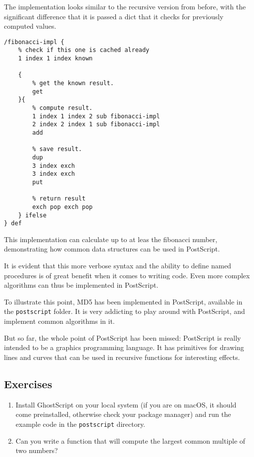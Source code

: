 \documentclass[a4paper,twocolumn]{article}
\begin{document}
The implementation looks similar to the recursive version from before, with the significant difference that it is passed a dict that it checks for previously computed values.

\begin{verbatim}
/fibonacci-impl {
    % check if this one is cached already
    1 index 1 index known

    {
        % get the known result.
        get
    }{
        % compute result.
        1 index 1 index 2 sub fibonacci-impl
        2 index 2 index 1 sub fibonacci-impl
        add

        % save result.
        dup
        3 index exch
        3 index exch
        put

        % return result
        exch pop exch pop
    } ifelse
} def  
\end{verbatim}

This implementation can calculate up to at leas the  fibonacci number, demonstrating how common data structures can be used in PostScript.

It is evident that this more verbose syntax and the ability to define named procedures is of great benefit when it comes to writing code. Even more complex algorithms can thus be implemented in PostScript.

To illustrate this point, MD5 has been implemented in PostScript, available in the \verb|postscript| folder. It is very addicting to play around with PostScript, and implement common algorithms in it.

But so far, the whole point of PostScript has been missed: PostScript is really intended to be a graphics programming language. It has primitives for drawing lines and curves that can be used in recursive functions for interesting effects.


\subsection*{Exercises}

\begin{enumerate}
  \item Install GhostScript on your local system (if you are on macOS, it should come preinstalled, otherwise check your package manager) and run the example code in the \verb|postscript| directory.
 
  \item Can you write a function that will compute the largest common multiple of two numbers?
\end{enumerate}
\end{document}
